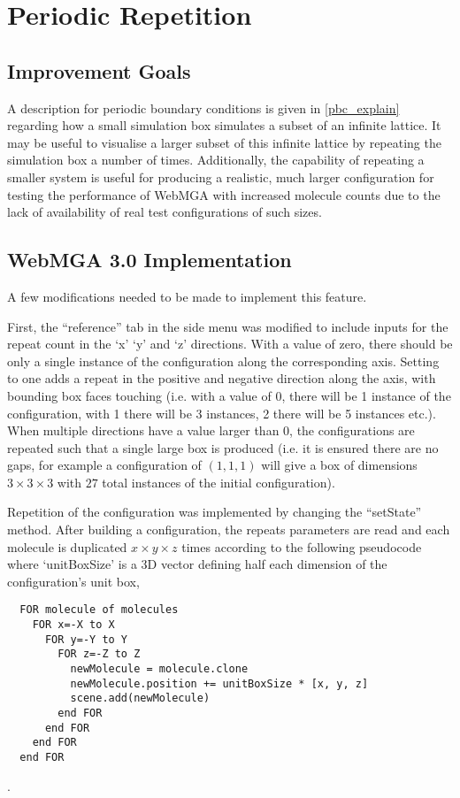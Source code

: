 \section{Periodic Repetition}
\label{peridodic_section}
\subsection{Improvement Goals}
A description for periodic boundary conditions is given in \cref{pbc_explain} regarding how a small simulation box simulates a subset of an infinite lattice. It may be useful to visualise a larger subset of this infinite lattice by repeating the simulation box a number of times. Additionally, the capability of repeating a smaller system is useful for producing a realistic, much larger configuration for testing the performance of WebMGA with increased molecule counts due to the lack of availability of real test configurations of such sizes.

\subsection{WebMGA 3.0 Implementation}
A few modifications needed to be made to implement this feature.

First, the ``reference'' tab in the side menu was modified to include inputs for the repeat count in the `x' `y' and `z' directions. With a value of zero, there should be only a single instance of the configuration along the corresponding axis. Setting to one adds a repeat in the positive and negative direction along the axis, with bounding box faces touching (i.e. with a value of 0, there will be 1 instance of the configuration, with 1 there will be 3 instances, 2 there will be 5 instances etc.). When multiple directions have a value larger than 0, the configurations are repeated such that a single large box is produced (i.e. it is ensured there are no gaps, for example a configuration of $(1,1,1)$ will give a box of dimensions $3\times 3\times 3$ with $27$ total instances of the initial configuration).

Repetition of the configuration was implemented by changing the ``setState'' method. After building a configuration, the repeats parameters are read and each molecule is duplicated $x \times y \times z$ times according to the following pseudocode where `unitBoxSize' is a 3D vector defining half each dimension of the configuration's unit box,

\begin{lstlisting}
  FOR molecule of molecules
    FOR x=-X to X
      FOR y=-Y to Y
        FOR z=-Z to Z
          newMolecule = molecule.clone
          newMolecule.position += unitBoxSize * [x, y, z]
          scene.add(newMolecule)
        end FOR
      end FOR
    end FOR
  end FOR
\end{lstlisting}.

